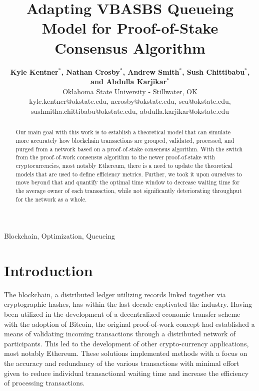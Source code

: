 \documentclass[conference]{IEEEtran}
\begin{document}
\title{Adapting VBASBS Queueing Model for Proof-of-Stake Consensus Algorithm}

\author{
  \textbf{Kyle Kentner$^*$, Nathan Crosby$^*$, Andrew Smith$^*$, Sush Chittibabu$^*$, and Abdulla Karjikar$^*$}\\
  Oklahoma State University - Stillwater, OK \\
  kyle.kentner@okstate.edu, ncrosby@okstate.edu, scu@okstate.edu, \\
  sushmitha.chittibabu@okstate.edu, abdulla.karjikar@okstate.edu}

\maketitle

\def\thefootnote{*}\def\thefootnote{\arabic{footnote}}

\begin{abstract}

Our main goal with this work is to establish a theoretical model that can simulate
more accurately how blockchain transactions are grouped, validated, processed,
and purged from a network based on a proof-of-stake consensus algorithm. With 
the switch from the proof-of-work consensus algorithm to the newer proof-of-stake with 
cryptocurrencies, most notably Ethereum, there is a need to update the theoretical 
models that are used to define efficiency metrics. Further, we took it upon ourselves 
to move beyond that and quantify the optimal time window to decrease waiting time
for the average owner of each transaction, while not significantly deteriorating throughput
for the network as a whole.

\end{abstract}

\begin{IEEEkeywords}
Blockchain, Optimization, Queueing
\end{IEEEkeywords}

\section{Introduction}\label{Intro}

The blockchain, a distributed ledger utilizing records linked together via cryptographic 
hashes, has within the last decade captivated the industry. Having been utilized in the 
development of a decentralized economic transfer scheme with the adoption of 
Bitcoin\cite{2008_Bitcoin_Nakamoto}, the original proof-of-work concept had established 
a means of validating incoming transactions through a distributed network of participants. 
This led to the development of other crypto-currency applications, most notably Ethereum. 
These solutions implemented methods with a focus on the accuracy and redundancy of the 
various transactions with minimal effort given to reduce individual transactional waiting 
time and increase the efficiency of processing transactions.
\end{document}
